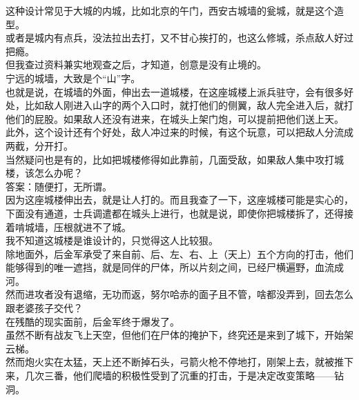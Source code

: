 \begin{multicols}{\theparacolNo}
这种设计常见于大城的内城，比如北京的午门，西安古城墙的瓮城，就是这个造型。\\

或者是城内有点兵，没法拉出去打，又不甘心挨打的，也这么修城，杀点敌人好过把瘾。\\

但我查过资料兼实地观查之后，才知道，创意是没有止境的。\\

宁远的城墙，大致是个“山”字。\\

也就是说，在城墙的外面，伸出去一道城楼，在这座城楼上派兵驻守，会有很多好处，比如敌人刚进入山字的两个入口时，就打他们的侧翼，敌人完全进入后，就打他们的屁股。如果敌人还没有进来，在城头上架门炮，可以提前把他们送上天。\\

此外，这个设计还有个好处，敌人冲过来的时候，有这个玩意，可以把敌人分流成两截，分开打。\\

当然疑问也是有的，比如把城楼修得如此靠前，几面受敌，如果敌人集中攻打城楼，该怎么办呢？\\

答案：随便打，无所谓。\\

因为这座城楼伸出去，就是让人打的。而且我查了一下，这座城楼可能是实心的，下面没有通道，士兵调遣都在城头上进行，也就是说，即使你把城楼拆了，还得接着啃城墙，压根就进不了城。\\

我不知道这城楼是谁设计的，只觉得这人比较狠。\\

除地面外，后金军承受了来自前、后、左、右、上（天上）五个方向的打击，他们能够得到的唯一遮挡，就是同伴的尸体，所以片刻之间，已经尸横遍野，血流成河。\\

然而进攻者没有退缩，无功而返，努尔哈赤的面子且不管，啥都没弄到，回去怎么跟老婆孩子交代？\\

在残酷的现实面前，后金军终于爆发了。\\

虽然不断有战友飞上天空，但他们在尸体的掩护下，终究还是来到了城下，开始架云梯。\\

然而炮火实在太猛，天上还不断掉石头，弓箭火枪不停地打，刚架上去，就被推下来，几次三番，他们爬墙的积极性受到了沉重的打击，于是决定改变策略——钻洞。\\


\end{multicols}
